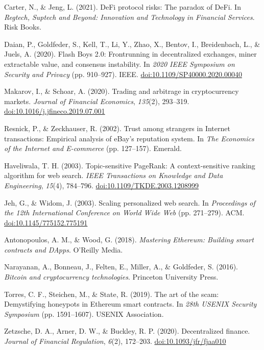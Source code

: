\begin{enumerate}[label={[\arabic*]}, leftmargin=*, itemsep=0.35em, parsep=0pt]
  \item{}\label{ref:54} Carter, N., \& Jeng, L. (2021). DeFi protocol risks: The paradox of DeFi. In \textit{Regtech, Suptech and Beyond: Innovation and Technology in Financial Services}. Risk Books.
  \item{}\label{ref:55} Daian, P., Goldfeder, S., Kell, T., Li, Y., Zhao, X., Bentov, I., Breidenbach, L., \& Juels, A. (2020). Flash Boys 2.0: Frontrunning in decentralized exchanges, miner extractable value, and consensus instability. In \textit{2020 IEEE Symposium on Security and Privacy} (pp. 910--927). IEEE. \href{https://doi.org/10.1109/SP40000.2020.00040}{doi:10.1109/SP40000.2020.00040}
  \item{}\label{ref:56} Makarov, I., \& Schoar, A. (2020). Trading and arbitrage in cryptocurrency markets. \textit{Journal of Financial Economics}, \textit{135}(2), 293--319. \href{https://doi.org/10.1016/j.jfineco.2019.07.001}{doi:10.1016/j.jfineco.2019.07.001}
  \item{}\label{ref:57} Resnick, P., \& Zeckhauser, R. (2002). Trust among strangers in Internet transactions: Empirical analysis of eBay's reputation system. In \textit{The Economics of the Internet and E-commerce} (pp. 127--157). Emerald.
  \item{}\label{ref:58} Haveliwala, T. H. (2003). Topic-sensitive PageRank: A context-sensitive ranking algorithm for web search. \textit{IEEE Transactions on Knowledge and Data Engineering}, \textit{15}(4), 784--796. \href{https://doi.org/10.1109/TKDE.2003.1208999}{doi:10.1109/TKDE.2003.1208999}
  \item{}\label{ref:59} Jeh, G., \& Widom, J. (2003). Scaling personalized web search. In \textit{Proceedings of the 12th International Conference on World Wide Web} (pp. 271--279). ACM. \href{https://doi.org/10.1145/775152.775191}{doi:10.1145/775152.775191}
  \item{}\label{ref:60} Antonopoulos, A. M., \& Wood, G. (2018). \textit{Mastering Ethereum: Building smart contracts and DApps}. O'Reilly Media.
  \item{}\label{ref:61} Narayanan, A., Bonneau, J., Felten, E., Miller, A., \& Goldfeder, S. (2016). \textit{Bitcoin and cryptocurrency technologies}. Princeton University Press.
  \item{}\label{ref:62} Torres, C. F., Steichen, M., \& State, R. (2019). The art of the scam: Demystifying honeypots in Ethereum smart contracts. In \textit{28th USENIX Security Symposium} (pp. 1591--1607). USENIX Association.
  \item{}\label{ref:63} Zetzsche, D. A., Arner, D. W., \& Buckley, R. P. (2020). Decentralized finance. \textit{Journal of Financial Regulation}, \textit{6}(2), 172--203. \href{https://doi.org/10.1093/jfr/fjaa010}{doi:10.1093/jfr/fjaa010}
\end{enumerate}

